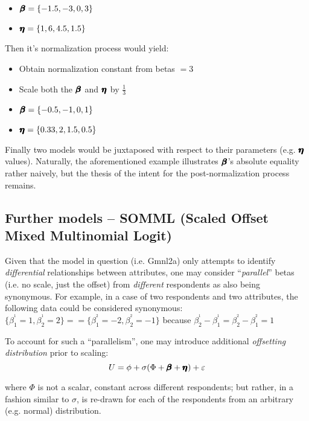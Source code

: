 \documentclass[12pt,a4paper]{article}
\begin{document}
\begin{itemize}
\item \(\pmb{\hm{\beta}} = \{-1.5, -3, 0, 3\}\)
\item \(\pmb{\hm{\eta}} = \{1, 6, 4.5, 1.5\}\)
\end{itemize}

Then it's normalization process would yield:
\begin{itemize}
\item Obtain normalization constant from betas \(=3\)
\item Scale both the \( \pmb{\hm{\beta}} \) and \( \pmb{\hm{\eta}} \) by \(\frac{1}{3}\)
\item \(\pmb{\hm{\beta}} = \{-0.5, -1, 0, 1\}\)
\item \(\pmb{\hm{\eta}} = \{0.33, 2, 1.5, 0.5\}\)
\end{itemize}

Finally two models would be juxtaposed with respect to their parameters (e.g. \(\pmb{\hm{\eta}}\) values). Naturally, the aforementioned example illustrates \(\pmb{\hm{\beta}}\)'s absolute equality rather naively, but the thesis of the intent for the post-normalization process remains. 

\subsection{Further models -- SOMML (Scaled Offset Mixed Multinomial Logit)}

Given that the model in question (i.e. Gmnl2a) only attempts to identify \textit{differential} relationships between attributes, one may consider ``\textit{parallel}'' betas (i.e. no scale, just the offset) from \textit{different} respondents as also being synonymous. For example, in a case of two respondents and two attributes, the following data could be considered synonymous: \(\{\beta^{^1}_{1} = 1, \beta^{^1}_{2} = 2\} == \{\beta^{^2}_{1} = -2, \beta^{^2}_{2} = -1\}\) because  \(\beta^{^1}_{2} - \beta^{^1}_{1}  = \beta^{^2}_{2} - \beta^{^2}_{1} = 1\)

To account for such a ``parallelism'', one may introduce additional \textit{offsetting distribution} prior to scaling:
{ \Large 
\begin{equation}
\label{eq:somml_1}
U=\phi + \sigma(\Phi + \pmb{\hm{\beta}}+\pmb{\hm{\eta}}) + \varepsilon
\end{equation}
}

where \(\Phi\) is not a scalar, constant across different respondents; but rather, in a fashion similar to \(\sigma\), is re-drawn for each of the respondents from an arbitrary (e.g. normal) distribution.
\end{document}
